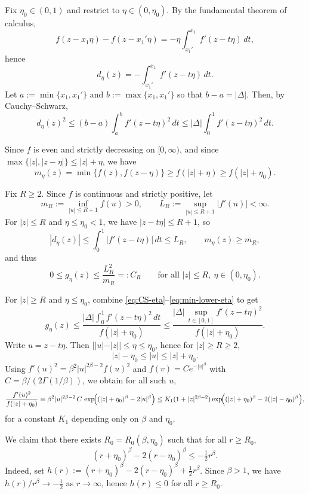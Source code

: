 \documentclass{article}
\theoremstyle{plain}
\theoremstyle{definition}
\begin{document}
Fix $\eta_0\in(0,1)$ and restrict to $\eta\in(0,\eta_0)$.
By the fundamental theorem of calculus,
\[
f(z-x_1\eta)-f(z-x_1'\eta)
=-\eta\int_{x_1'}^{x_1} f'(z-t\eta)\,dt,
\]
hence
\[
d_\eta(z)=-\int_{x_1'}^{x_1} f'(z-t\eta)\,dt.
\]
Let $a:=\min\{x_1,x_1'\}$ and $b:=\max\{x_1,x_1'\}$ so that $b-a=|\Delta|$.
Then, by Cauchy--Schwarz,
\begin{equation}\label{eq:CS-eta}
d_\eta(z)^2
\le (b-a)\int_a^b f'(z-t\eta)^2\,dt
\le |\Delta| \int_0^1 f'(z-t\eta)^2\,dt.
\end{equation}


Since $f$ is even and strictly decreasing on $[0,\infty)$, and since
$\max\{|z|,|z-\eta|\}\le |z|+\eta$, we have
\begin{equation}\label{eq:min-lower-eta}
m_\eta(z)=\min\{f(z),f(z-\eta)\}\ge f(|z|+\eta)\ge f(|z|+\eta_0).
\end{equation}


Fix $R\ge 2$. Since $f$ is continuous and strictly positive, let
\[
m_R:=\inf_{|u|\le R+1} f(u)>0,
\qquad
L_R:=\sup_{|u|\le R+1}|f'(u)|<\infty.
\]
For $|z|\le R$ and $\eta\le\eta_0<1$, we have $|z-t\eta|\le R+1$, so
\[
|d_\eta(z)|\le \int_0^1 |f'(z-t\eta)|\,dt \le L_R,
\qquad
m_\eta(z)\ge m_R,
\]
and thus
\begin{equation}\label{eq:compact-dom-eta}
0\le g_\eta(z)\le \frac{L_R^2}{m_R}=:C_R
\qquad\text{for all }|z|\le R,\ \eta\in(0,\eta_0).
\end{equation}


For $|z|\ge R$ and $\eta\le\eta_0$, combine \eqref{eq:CS-eta}--\eqref{eq:min-lower-eta} to get
\begin{equation}\label{eq:tail-start-eta}
g_\eta(z)
\le \frac{|\Delta|\int_0^1 f'(z-t\eta)^2\,dt}{f(|z|+\eta_0)}
\le \frac{|\Delta|\,\sup_{t\in[0,1]} f'(z-t\eta)^2}{f(|z|+\eta_0)}.
\end{equation}
Write $u=z-t\eta$. Then $||u|-|z||\le \eta\le \eta_0$, hence for $|z|\ge R\ge 2$,
\[
|z|-\eta_0 \le |u|\le |z|+\eta_0.
\]
Using $f'(u)^2=\beta^2|u|^{2\beta-2}f(u)^2$ and $f(v)=Ce^{-|v|^\beta}$ with
$C=\beta/(2\Gamma(1/\beta))$, we obtain for all such $u$,
\[
\frac{f'(u)^2}{f(|z|+\eta_0)}
=\beta^2|u|^{2\beta-2}\,C\,\exp\!\Bigl((|z|+\eta_0)^\beta-2|u|^\beta\Bigr)
\le K_1(1+|z|^{2\beta-2})\exp\!\Bigl((|z|+\eta_0)^\beta-2(|z|-\eta_0)^\beta\Bigr),
\]
for a constant $K_1$ depending only on $\beta$ and $\eta_0$.

We claim that there exists $R_0=R_0(\beta,\eta_0)$ such that for all $r\ge R_0$,
\begin{equation}\label{eq:exp-neg-eta}
(r+\eta_0)^\beta-2(r-\eta_0)^\beta \le -\tfrac12 r^\beta.
\end{equation}
Indeed, set $h(r):=(r+\eta_0)^\beta-2(r-\eta_0)^\beta+\tfrac12 r^\beta$.
Since $\beta>1$, we have $h(r)/r^\beta\to -\tfrac12$ as $r\to\infty$, hence $h(r)\le 0$ for all $r\ge R_0$.
\end{document}
